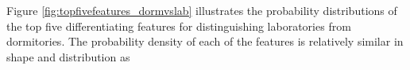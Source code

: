 Figure \ref{fig:topfivefeatures_dormvslab} illustrates the probability distributions of the top five differentiating features for distinguishing laboratories from dormitories. The probability density of each of the features is relatively similar in shape and distribution as 